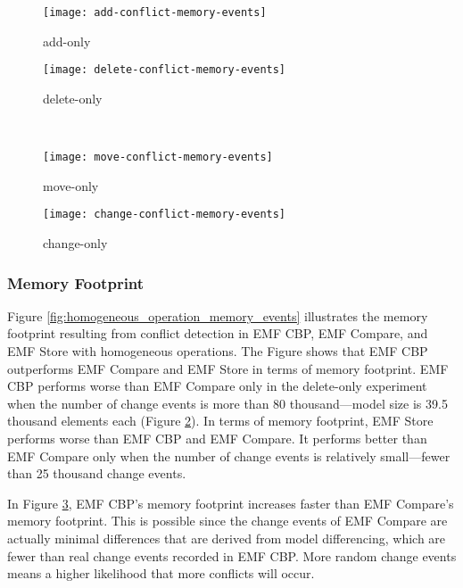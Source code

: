 \begin{figure*}[ht]
  \centering
  \begin{subfigure}[t]{0.490\linewidth}
    \texttt{[image: add-conflict-memory-events]}
    \caption{add-only}
    \label{fig:add-conflict-memory-events}
  \end{subfigure}
  \hfill
  \begin{subfigure}[t]{0.490\linewidth}
    \texttt{[image: delete-conflict-memory-events]}
    \caption{delete-only}
    \label{fig:delete-conflict-memory-events}
  \end{subfigure}
  \\
  \begin{subfigure}[t]{0.490\linewidth}
    \texttt{[image: move-conflict-memory-events]}
    \caption{move-only}
    \label{fig:move-conflict-memory-events}
  \end{subfigure}
  \hfill
  \begin{subfigure}[t]{0.490\linewidth}
    \texttt{[image: change-conflict-memory-events]}
    \caption{change-only}
    \label{fig:change-conflict-memory-events}
  \end{subfigure}
  \caption{Conflict detection memory for homogeneous operations.}
  \label{fig:homogeneous_operation_memory_events}
\end{figure*}

\subsubsection{Memory Footprint}
\label{sec:memory_footprint}
Figure \ref{fig:homogeneous_operation_memory_events} illustrates the memory footprint resulting from conflict detection in EMF CBP, EMF Compare, and EMF Store with homogeneous operations. The Figure shows that EMF CBP outperforms EMF Compare and EMF Store in terms of memory footprint. EMF CBP performs worse than EMF Compare only in the delete-only experiment when the number of change events is more than 80 thousand—model size is 39.5 thousand elements each (Figure \ref{fig:delete-conflict-memory-events}). In terms of memory footprint, EMF Store performs worse than EMF CBP and EMF Compare. It performs better than EMF Compare only when the number of change events is relatively small—fewer than 25 thousand change events.

In Figure \ref{fig:move-conflict-memory-events}, EMF CBP’s memory footprint increases faster than EMF Compare’s memory footprint. This is possible since the change events of EMF Compare are actually minimal differences that are derived from model differencing, which are fewer than real change events recorded in EMF CBP. More random change events means a higher likelihood that more conflicts will occur.

